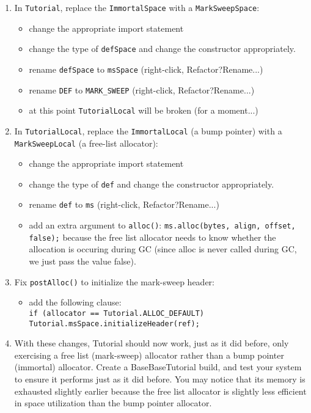 \documentclass[textsize=14pt]{article}
\newcommand{\code}[1]{\texttt{#1}}
\newcommand{\menu}[0]{?}
\begin{document}
\begin{itemize}
\begin{enumerate}
\begin{enumerate}
        \item In \code{Tutorial}, replace the \code{ImmortalSpace} with a
        \code{MarkSweepSpace}:
        \begin{itemize}
            \item change the appropriate import statement
            \item change the type of \code{defSpace} and change the constructor
            appropriately.
            \item rename \code{defSpace} to \code{msSpace} (right-click, Refactor\menu{}Rename...)
            \item rename \code{DEF} to \code{MARK\_SWEEP} (right-click, Refactor\menu{}Rename...)
            \item at this point \code{TutorialLocal} will be broken (for a moment...)
        \end{itemize}

        \item In \code{TutorialLocal}, replace the \code{ImmortalLocal} (a bump
        pointer) with a \code{MarkSweepLocal} (a free-list allocator):
        \begin{itemize}
            \item change the appropriate import statement
            \item change the type of \code{def} and change the constructor appropriately.
            \item rename \code{def} to \code{ms} (right-click, Refactor?Rename...)
            \item add an extra argument to \code{alloc()}: \code{ms.alloc(bytes, align, offset,
            false);} because the free list allocator needs to know whether the allocation
            is occuring during GC (since alloc is never called during GC, we just pass the
            value false).
        \end{itemize}

        \item Fix \code{postAlloc()} to initialize the mark-sweep header:
        \begin{itemize}
            \item add the following clause: \\
            \code{if (allocator == Tutorial.ALLOC\_DEFAULT) \\
            Tutorial.msSpace.initializeHeader(ref);}
        \end{itemize}


        \item With these changes, Tutorial should now work, just as it did before,
        only exercising a free list (mark-sweep) allocator rather than a bump pointer
        (immortal) allocator. Create a BaseBaseTutorial build, and test your system to
        ensure it performs just as it did before.  You may notice that its
        memory is exhausted slightly earlier because the free list allocator
        is slightly less efficient in space utilization than the bump
        pointer allocator.
    \end{enumerate}




\end{enumerate}
\end{itemize}
\end{document}
